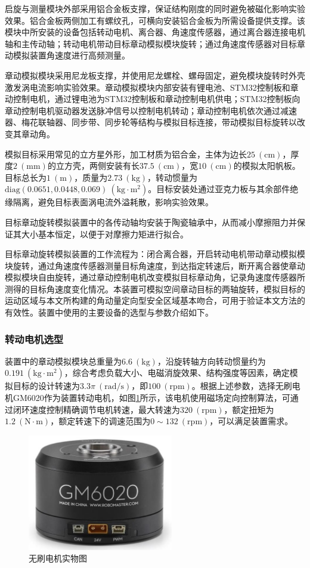 \documentclass[lang=chs, degree=master, blindreview=false, winfonts=true]{yanputhesis}
\begin{document}
启旋与测量模块外部采用铝合金板支撑，保证结构刚度的同时避免被磁化影响实验效果。铝合金板两侧加工有螺纹孔，可横向安装铝合金板为所需设备提供支撑。该模块中所安装的设备包括转动电机、离合器、角速度传感器，通过离合器连接电机轴和主传动轴；转动电机带动目标章动模拟模块旋转；通过角速度传感器对目标章动模拟装置角速度进行高频测量。

章动模拟模块采用尼龙板支撑，并使用尼龙螺栓、螺母固定，避免模块旋转时外壳激发涡电流影响实验效果。章动模拟模块内部安装有锂电池、STM32控制板和章动控制电机，通过锂电池为STM32控制板和章动控制电机供电；STM32控制板向章动控制电机驱动器发送脉冲信号以控制电机转动；章动控制电机依次通过减速器、梅花联轴器、同步带、同步轮等结构与模拟目标连接，带动模拟目标旋转以改变其章动角。

模拟目标采用常见的立方星外形，加工材质为铝合金，主体为边长$25\ (\mathrm{cm})$，厚度$2\ (\mathrm{mm})$的立方壳，两侧安装有长$37.5\ (\mathrm{cm})$，宽$10\ (\mathrm{cm})$的模拟太阳帆板。目标总长为$1\ (\mathrm{m})$，质量为$2.73\ (\mathrm{kg})$，转动惯量为$\mathrm{diag}(0.0651,0.0448,0.069)\ (\mathrm{kg\cdot m^2})$。目标安装处通过亚克力板与其余部件绝缘隔离，避免目标表面涡电流外溢耗散，影响实验效果。

目标章动旋转模拟装置中的各传动轴均安装于陶瓷轴承中，从而减小摩擦阻力并保证其大小基本恒定，以便于对摩擦力矩进行拟合。

目标章动旋转模拟装置的工作流程为：闭合离合器，开启转动电机带动章动模拟模块旋转，通过角速度传感器测量目标角速度，到达指定转速后，断开离合器使章动模拟模块自由旋转，通过章动控制电机改变模拟目标章动角，记录角速度传感器所测得的目标角速度变化情况。本装置可模拟空间章动目标的两轴旋转，模拟目标的运动区域与本文所构建的角动量定向型安全区域基本吻合，可用于验证本文方法的有效性。装置中使用的主要设备的选型与参数介绍如下。

\subsubsection{转动电机选型}
装置中的章动模拟模块总重量为$6.6\ (\mathrm{kg})$，沿旋转轴方向转动惯量约为$0.191\ (\mathrm{kg\cdot m^2})$，综合考虑负载大小、电磁消旋效果、结构强度等因素，确定模拟目标的设计转速为$3.3\pi\ (\mathrm{rad/s})$，即$100\ (\mathrm{rpm})$。根据上述参数，选择无刷电机GM6020作为装置转动电机，如图\ref{fig:wushuamotor}所示，该电机使用磁场定向控制算法，可通过闭环速度控制精确调节电机转速，最大转速为$320\ (\mathrm{rpm})$，额定扭矩为$1.2\ (\mathrm{N \cdot m})$，额定转速下的调速范围为$0\sim 132\ (\mathrm{rpm})$，可以满足装置需求。
\begin{figure}[htbp]
	\centering
	\includegraphics[width = 2.5in]{picture/wushuamotor.jpg}
	\caption{无刷电机实物图}
	\label{fig:wushuamotor}
\end{figure}
\end{document}
